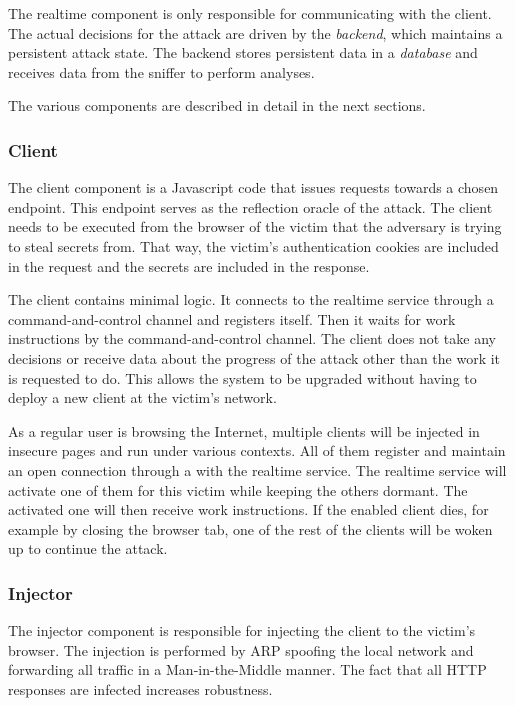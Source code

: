 The realtime component is only responsible for communicating with the client.
The actual decisions for the attack are driven by the \textit{backend}, which
maintains a persistent attack state. The backend stores persistent data in a
\textit{database} and receives data from the sniffer to perform analyses.

The various components are described in detail in the next sections.

\subsubsection{Client}

The client component is a Javascript code that issues requests towards a chosen
endpoint. This endpoint serves as the reflection oracle of the attack. The client
needs to be executed from the browser of the victim that the adversary is trying
to steal secrets from. That way, the victim's authentication cookies are
included in the request and the secrets are included in the
response.

The client contains minimal logic. It connects to the realtime service through
a command-and-control channel and registers itself. Then it waits
for work instructions by the command-and-control channel. The
client does not take any decisions or receive data about the progress of the
attack other than the work it is requested to do.
This allows the system to be upgraded without having to deploy a
new client at the victim's network.

As a regular user is browsing the Internet, multiple clients will be
injected in insecure pages and run under various contexts. All of
them register and maintain an open connection through a
with the realtime service. The realtime
service will activate one of them for this victim while keeping the others
dormant. The activated one will then receive work instructions. If the enabled
client dies, for example by closing the browser
tab, one of the rest of the clients will be woken up to continue the
attack.

\subsubsection{Injector}

The injector component is responsible for injecting the client to the victim's
browser. The injection is performed by ARP spoofing the local
network and forwarding all traffic in a Man-in-the-Middle manner. The fact that all HTTP
responses are infected increases robustness.

